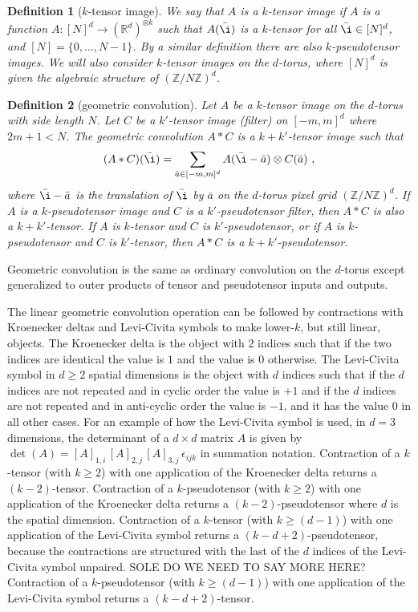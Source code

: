 \documentclass{article}
\theoremstyle{plain}
\newtheorem{definition}{Definition}
\begin{document}
\begin{definition}[$k$-tensor image]
We say that $A$ is a $k$-tensor image if $A$ is a function $A: [N]^d \to (\mathbb R^d)^{\otimes k}$ such that $A(\bar \i)$ is a $k$-tensor for all $\bar \i \in [N]^d$, and $[N]=\{0,\ldots, N-1\}$.
By a similar definition there are also $k$-pseudotensor images.
We will also consider $k$-tensor images on the $d$-torus, where $[N]^d$ is given the algebraic structure of $(\mathbb Z / N\mathbb Z)^d$.
\end{definition}

\begin{definition}[geometric convolution]
Let $A$ be a $k$-tensor image on the $d$-torus with side length $N$.
Let $C$ be a $k'$-tensor image (filter) on $[-m, m]^d$ where $2m+1<N$.
The geometric convolution $A\ast C$ is a $k+k'$-tensor image such that
\begin{equation}
    (A\ast C)(\bar\i) = \sum_{\bar a\in[-m, m]^d} A(\bar\i - \bar a)\otimes C(\bar a) ~,
\end{equation}
where $\bar\i - \bar a$ is the translation of $\bar\i$ by $\bar a$ on the $d$-torus pixel grid $(\mathbb Z / N\mathbb Z)^d$.
If $A$ is a $k$-pseudotensor image and $C$ is a $k'$-pseudotensor filter, then $A\ast C$ is also a $k+k'$-tensor.
If $A$ is $k$-tensor and $C$ is $k'$-pseudotensor, or if $A$ is $k$-pseudotensor and $C$ is $k'$-tensor, then $A\ast C$ is a $k+k'$-pseudotensor.
\end{definition}

Geometric convolution is the same as ordinary convolution on the $d$-torus except generalized to outer products of tensor and pseudotensor inputs and outputs.

The linear geometric convolution operation can be followed by contractions with Kroenecker deltas and Levi-Civita symbols to make lower-$k$, but still linear, objects.
The Kroenecker delta is the object with 2 indices such that if the two indices are identical the value is $1$ and the value is $0$ otherwise.
The Levi-Civita symbol in $d\geq 2$ spatial dimensions is the object with $d$ indices such that if the $d$ indices are not repeated and in cyclic order the value is $+1$ and if the $d$ indices are not repeated and in anti-cyclic order the value is $-1$, and it has the value $0$ in all other cases.
For an example of how the Levi-Civita symbol is used, in $d=3$ dimensions, the determinant of a $d\times d$ matrix $A$ is given by $\det(A) = [A]_{1,i}\,[A]_{2,j}\,[A]_{3,j}\,\epsilon_{ijk}$ in summation notation.
Contraction of a $k$-tensor (with $k\geq 2$) with one application of the Kroenecker delta returns a $(k-2)$-tensor.
Contraction of a $k$-pseudotensor (with $k\geq 2$) with one application of the Kroenecker delta returns a $(k-2)$-pseudotensor where $d$ is the spatial dimension.
Contraction of a $k$-tensor (with $k\geq (d-1)$) with one application of the Levi-Civita symbol returns a $(k-d+2)$-pseudotensor, because the contractions are structured with the last of the $d$ indices of the Levi-Civita symbol unpaired. SOLE DO WE NEED TO SAY MORE HERE?
Contraction of a $k$-pseudotensor (with $k\geq (d-1)$) with one application of the Levi-Civita symbol returns a $(k-d+2)$-tensor.
\end{document}
